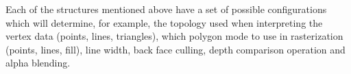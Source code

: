 Each of the structures mentioned above have a set of possible configurations which will determine, for example, the topology used when interpreting the vertex data (points, lines, triangles), which polygon mode to use in rasterization (points, lines, fill), line width, back face culling, depth comparison operation and alpha blending.
